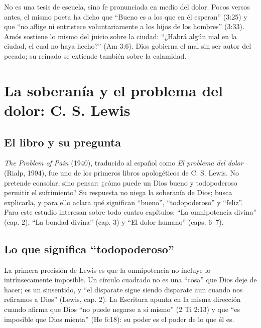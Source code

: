 No es una tesis de escuela, sino fe pronunciada en medio del dolor. Pocos versos antes, el mismo poeta ha dicho que ``Bueno es \SENOR{} a los que en él esperan'' (3:25) y que ``no aflige ni entristece voluntariamente a los hijos de los hombres'' (3:33). Amós sostiene lo mismo del juicio sobre la ciudad: ``¿Habrá algún mal en la ciudad, el cual \SENOR{} no haya hecho?'' (Am 3:6). Dios gobierna el mal sin ser autor del pecado; su reinado se extiende también sobre la calamidad.

\section{La soberanía y el problema del dolor: C. S. Lewis}

\subsection{El libro y su pregunta}
\emph{The Problem of Pain} (1940), traducido al español como \emph{El problema del dolor} (Rialp, 1994), fue uno de los primeros libros apologéticos de C. S. Lewis. No pretende consolar, sino pensar: ¿cómo puede un Dios bueno y todopoderoso permitir el sufrimiento? Su respuesta no niega la soberanía de Dios; busca explicarla, y para ello aclara qué significan ``bueno'', ``todopoderoso'' y ``feliz''. Para este estudio interesan sobre todo cuatro capítulos: ``La omnipotencia divina'' (cap. 2), ``La bondad divina'' (cap. 3) y ``El dolor humano'' (caps. 6--7).


\subsection{Lo que significa “todopoderoso”}
La primera precisión de Lewis es que la omnipotencia no incluye lo intrínsecamente imposible. Un círculo cuadrado no es una ``cosa'' que Dios deje de hacer; es un sinsentido, y ``el disparate sigue siendo disparate aun cuando nos refiramos a Dios'' (Lewis, cap. 2). La Escritura apunta en la misma dirección cuando afirma que Dios ``no puede negarse a sí mismo'' (2 Ti 2:13) y que ``es imposible que Dios mienta'' (He 6:18): su poder es el poder de lo que él es.

